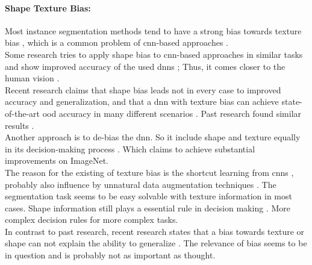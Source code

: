 		\paragraph{Shape Texture Bias:} Most instance segmentation methods tend to have a strong bias towards texture bias \cite{Theodoridis2022}, which is a common problem of \ac{cnn}-based approaches \cite{Geirhos2022}\cite{Baker2018}\cite{Tabak2023}.\\
		Some research tries to apply shape bias to \ac{cnn}-based approaches in similar tasks and show improved accuracy of the used \ac{dnn}s \cite{Geirhos2022}\cite{Hermann2020}; Thus, it comes closer to the human vision \cite{Geirhos2020}\cite{Mohla2022}\cite{Baker2020}.\\
		Recent research claims that shape bias leads not in every case to improved accuracy and generalization, and that a \ac{dnn} with texture bias can achieve state-of-the-art \ac{ood} accuracy in many different scenarios \cite{Qiu2024}. Past research found similar results \cite{Brochu2019}.\\
		Another approach is to de-bias the \ac{dnn}. So it include shape and texture equally in its decision-making process \cite{Li2021}\cite{Co2021}\cite{Chung2023}. Which claims to achieve substantial improvements on ImageNet. \\
		The reason for the existing of texture bias is the shortcut learning from \ac{cnn}s \cite{Geirhos2020}, probably also influence by unnatural data augmentation techniques \cite{Hermann2020}. The segmentation task seems to be easy solvable with texture information in most cases. Shape information still plays a essential rule in decision making \cite{Tabak2023}. More complex decision rules for more complex tasks.\\
		In contrast to past research, recent research states that a bias towards texture or shape can not explain the ability to generalize \cite{Gavrikov2024}. The relevance of bias seems to be in question and is probably not as important as thought.%
